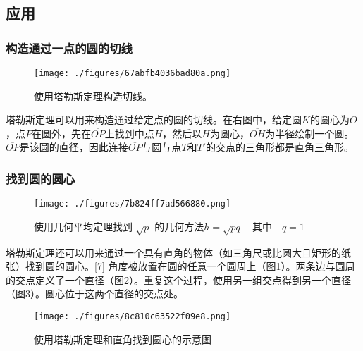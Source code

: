 \subsection{应用}  
\subsubsection{构造通过一点的圆的切线}
\begin{figure}[ht]
\centering
\texttt{[image: ./figures/67abfb4036bad80a.png]}
\caption{使用塔勒斯定理构造切线。} \label{fig_Thales_7}
\end{figure}
塔勒斯定理可以用来构造通过给定点的圆的切线。在右图中，给定圆\(K\)的圆心为\(O\)，点\(P\)在圆外，先在\(\overline{OP}\)上找到中点\(H\)，然后以\(H\)为圆心，\(\overline{OH}\)为半径绘制一个圆。\(\overline{OP}\)是该圆的直径，因此连接\(\overline{OP}\)与圆与点\(T\)和\(T'\)的交点的三角形都是直角三角形。
\subsubsection{找到圆的圆心}
\begin{figure}[ht]
\centering
\texttt{[image: ./figures/7b824ff7ad566880.png]}
\caption{使用几何平均定理找到 \(\sqrt{p}\) 的几何方法\(h = \sqrt{pq} \quad \text{其中} \quad q = 1\)}\label{fig_Thales_8}
\end{figure}
塔勒斯定理还可以用来通过一个具有直角的物体（如三角尺或比圆大且矩形的纸张）找到圆的圆心。[7] 角度被放置在圆的任意一个圆周上（图1）。两条边与圆周的交点定义了一个直径（图2）。重复这个过程，使用另一组交点得到另一个直径（图3）。圆心位于这两个直径的交点处。
\begin{figure}[ht]
\centering
\texttt{[image: ./figures/8c810c63522f09e8.png]}
\caption{使用塔勒斯定理和直角找到圆心的示意图} \label{fig_Thales_9}
\end{figure}
